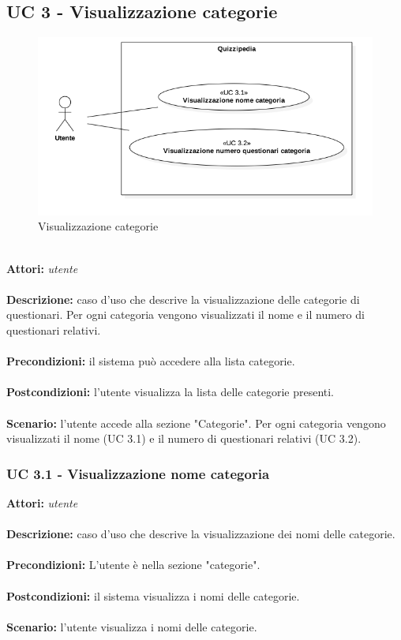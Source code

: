 \documentclass[a4paper,11pt]{article}
\begin{document}
\subsection{UC 3 - Visualizzazione categorie}

\begin{figure}[h!]
\centering
\includegraphics[scale=0.6]{../immagini/UC3.png}
\caption{Visualizzazione categorie}
\end{figure}
\ \\
\textbf{Attori:} \textit{utente}
\\ \\
\textbf{Descrizione:} caso d'uso che descrive la visualizzazione delle categorie di questionari. Per ogni categoria vengono visualizzati il nome e il numero di questionari relativi.\\
\\
\textbf{Precondizioni:} il sistema può accedere alla lista categorie.\\
\\
\textbf{Postcondizioni:} l’utente visualizza la lista delle categorie presenti.\\
\\
\textbf{Scenario:} l’utente accede alla sezione "Categorie". Per ogni categoria vengono visualizzati il nome (UC 3.1) e il numero di questionari relativi (UC 3.2).\\


\subsubsection{UC 3.1 - Visualizzazione nome categoria}

\textbf{Attori:} \textit{utente}
\\ \\
\textbf{Descrizione:} caso d'uso che descrive la visualizzazione dei nomi delle categorie.\\
\\
\textbf{Precondizioni:} L'utente è nella sezione "categorie".\\
\\
\textbf{Postcondizioni:} il sistema visualizza i nomi delle categorie.\\
\\
\textbf{Scenario:} l’utente visualizza i nomi delle categorie.\\
\end{document}
